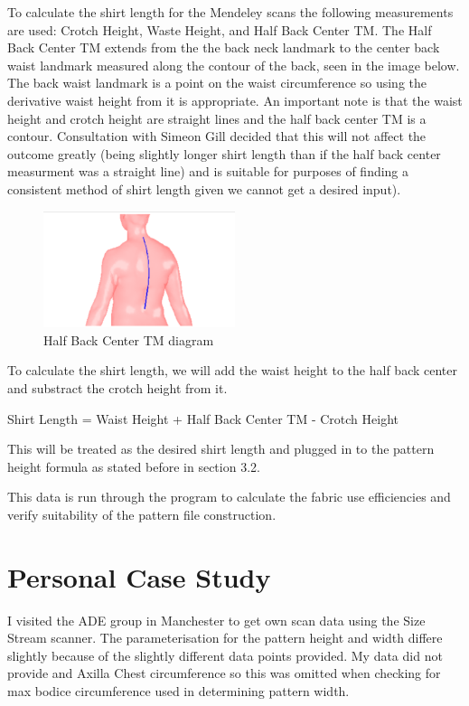 To calculate the shirt length for the Mendeley scans the following measurements are used: Crotch Height, Waste Height, and Half Back Center TM. The Half Back Center TM extends from the the back neck landmark to the center back waist landmark measured along the contour of the back, seen in the image below. The back waist landmark is a point on the waist circumference so using the derivative waist height from it is appropriate. An important note is that the waist height and crotch height are straight lines and the half back center TM is a contour. Consultation with Simeon Gill decided that this will not affect the outcome greatly (being slightly longer shirt length than if the half back center measurment was a straight line) and is suitable for purposes of finding a consistent method of shirt length given we cannot get a desired input).
\begin{figure} [H] %
    \centering %
    \includegraphics[width = 0.5\textwidth]{Images/HBC TM.png} %
    \caption{Half Back Center TM diagram}
\end{figure}
To calculate the shirt length, we will add the waist height to the half back center and substract the crotch height from it.

Shirt Length = Waist Height + Half Back Center TM - Crotch Height

This will be treated as the desired shirt length and plugged in to the pattern height formula as stated before in section 3.2. 

This data is run through the program to calculate the fabric use efficiencies and verify suitability of the pattern file construction.

\section{Personal Case Study}
I visited the ADE group in Manchester to get own scan data using the Size Stream scanner. The parameterisation for the pattern height and width differe slightly because of the slightly different data points provided. 
My data did not provide and Axilla Chest circumference so this was omitted when checking for max bodice circumference used in determining pattern width.

